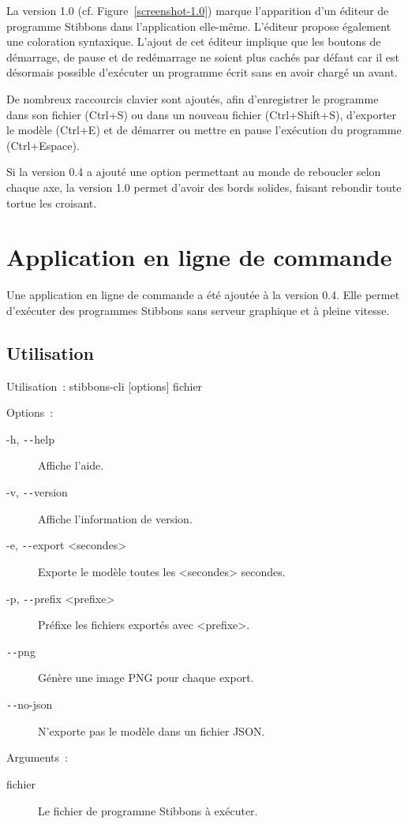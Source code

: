 La version 1.0 (cf. Figure~\ref{screenshot-1.0}) marque l'apparition d'un éditeur de programme Stibbons dans l'application elle-même. L'éditeur propose également une coloration syntaxique. L'ajout de cet éditeur implique que les boutons de démarrage, de pause et de redémarrage ne soient plus cachés par défaut car il est désormais possible d'exécuter un programme écrit sans en avoir chargé un avant.

De nombreux raccourcis clavier sont ajoutés, afin d'enregistrer le programme dans son fichier (Ctrl+S) ou dans un nouveau fichier (Ctrl+Shift+S), d'exporter le modèle (Ctrl+E) et de démarrer ou mettre en pause l'exécution du programme (Ctrl+Espace).

Si la version 0.4 a ajouté une option permettant au monde de reboucler selon chaque axe, la version 1.0 permet d'avoir des bords solides, faisant rebondir toute tortue les croisant.

\section{Application en ligne de commande}

Une application en ligne de commande a été ajoutée à la version 0.4. Elle permet d'exécuter des programmes Stibbons sans serveur graphique et à pleine vitesse.

\subsection{Utilisation}

Utilisation~: stibbons-cli [options] fichier

Options~:
\begin{description}
	\item[-h, \texttt{-{}-}help] Affiche l'aide.
	\item[-v, \texttt{-{}-}version] Affiche l'information de version.
	\item[-e, \texttt{-{}-}export <secondes>] Exporte le modèle toutes les <secondes> secondes.
	\item[-p, \texttt{-{}-}prefix <prefixe>] Préfixe les fichiers exportés avec <prefixe>.
	\item[\texttt{-{}-}png] Génère une image PNG pour chaque export.
	\item[\texttt{-{}-}no-json] N'exporte pas le modèle dans un fichier JSON.
\end{description}

Arguments~:
\begin{description}
	\item[fichier] Le fichier de programme Stibbons à exécuter.
\end{description}

